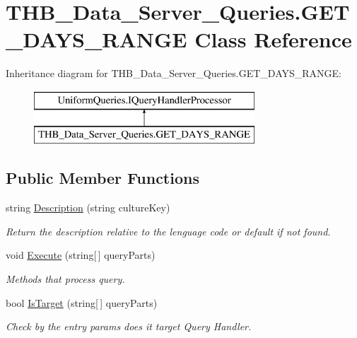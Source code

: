 \hypertarget{class_t_h_b___data___server___queries_1_1_g_e_t___d_a_y_s___r_a_n_g_e}{}\section{T\+H\+B\+\_\+\+Data\+\_\+\+Server\+\_\+\+Queries.\+G\+E\+T\+\_\+\+D\+A\+Y\+S\+\_\+\+R\+A\+N\+GE Class Reference}
\label{class_t_h_b___data___server___queries_1_1_g_e_t___d_a_y_s___r_a_n_g_e}
Inheritance diagram for T\+H\+B\+\_\+\+Data\+\_\+\+Server\+\_\+\+Queries.\+G\+E\+T\+\_\+\+D\+A\+Y\+S\+\_\+\+R\+A\+N\+GE\+:\begin{figure}[H]
\begin{center}
\leavevmode
\includegraphics[height=2.000000cm]{de/de2/class_t_h_b___data___server___queries_1_1_g_e_t___d_a_y_s___r_a_n_g_e}
\end{center}
\end{figure}
\subsection*{Public Member Functions}
\begin{DoxyCompactItemize}
\item 
string \mbox{\hyperlink{class_t_h_b___data___server___queries_1_1_g_e_t___d_a_y_s___r_a_n_g_e_aa91ce7c90a325c70aab9aaf112fe49f3}{Description}} (string culture\+Key)
\begin{DoxyCompactList}\small\item\em Return the description relative to the lenguage code or default if not found. \end{DoxyCompactList}\item 
void \mbox{\hyperlink{class_t_h_b___data___server___queries_1_1_g_e_t___d_a_y_s___r_a_n_g_e_adb606b0ed5b0bceaa96ce14ba34158c9}{Execute}} (string\mbox{[}$\,$\mbox{]} query\+Parts)
\begin{DoxyCompactList}\small\item\em Methods that process query. \end{DoxyCompactList}\item 
bool \mbox{\hyperlink{class_t_h_b___data___server___queries_1_1_g_e_t___d_a_y_s___r_a_n_g_e_a2b21ca7e9599161544424cd0f7e55ef4}{Is\+Target}} (string\mbox{[}$\,$\mbox{]} query\+Parts)
\begin{DoxyCompactList}\small\item\em Check by the entry params does it target Query Handler. \end{DoxyCompactList}\end{DoxyCompactItemize}


